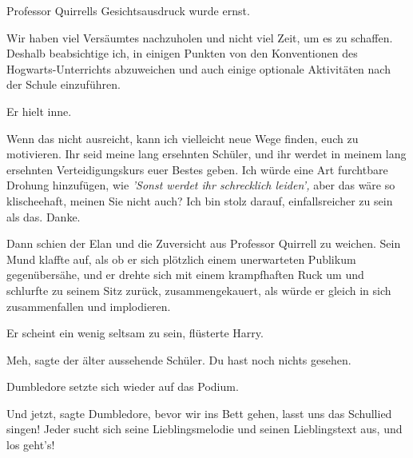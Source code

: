 Professor Quirrells Gesichtsausdruck wurde ernst.

\glqq{}Wir haben viel Versäumtes nachzuholen und nicht viel Zeit, um es zu
schaffen. Deshalb beabsichtige ich, in einigen Punkten von den Konventionen des
Hogwarts-Unterrichts abzuweichen und auch einige optionale Aktivitäten nach der
Schule einzuführen.\grqq{}

Er hielt inne.

\glqq{}Wenn das nicht ausreicht, kann ich vielleicht neue Wege finden, euch zu
motivieren. Ihr seid meine lang ersehnten Schüler, und ihr werdet in meinem lang
ersehnten Verteidigungskurs euer Bestes geben. Ich würde eine Art furchtbare
Drohung hinzufügen, wie
\emph{'Sonst werdet ihr schrecklich leiden',}
aber das wäre so klischeehaft, meinen Sie nicht auch? Ich bin stolz darauf,
einfallsreicher zu sein als das. Danke.\grqq{}

Dann schien der Elan und die Zuversicht aus Professor Quirrell zu weichen. Sein
Mund klaffte auf, als ob er sich plötzlich einem unerwarteten Publikum
gegenübersähe, und er drehte sich mit einem krampfhaften Ruck um und schlurfte
zu seinem Sitz zurück, zusammengekauert, als würde er gleich in sich
zusammenfallen und implodieren.

\glqq{}Er scheint ein wenig seltsam zu sein\grqq{}, flüsterte Harry.

\glqq{}Meh\grqq{}, sagte der älter aussehende Schüler. \glqq{}Du hast noch
nichts gesehen.\grqq{}

Dumbledore setzte sich wieder auf das Podium.

\glqq{}Und jetzt\grqq{}, sagte Dumbledore, \glqq{}bevor wir ins Bett gehen,
lasst uns das Schullied singen! Jeder sucht sich seine Lieblingsmelodie und
seinen Lieblingstext aus, und los geht's!\grqq{}